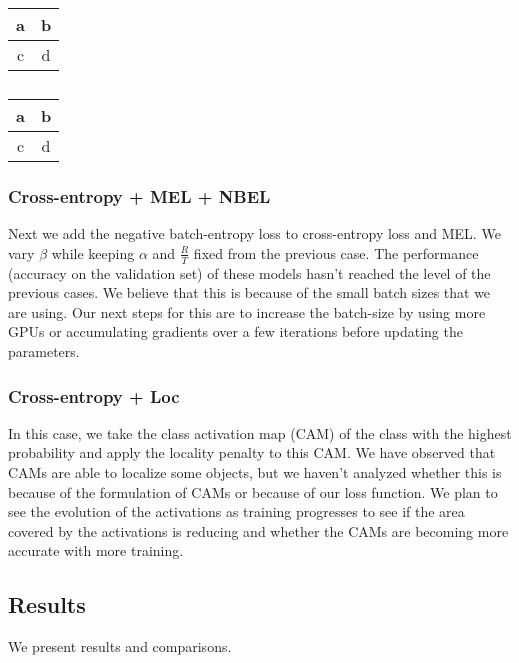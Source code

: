 \begin{table}
	\centering
	\begin{subtable}{0.15\textwidth}
	\centering
	\begin{tabular}{|c|c|}
		\hline
		a & b \\
		\hline
		c & d\\
		\hline
	\end{tabular}
	\caption{}
	\label{tab:cifar_mel_ratio}
	\end{subtable}
	\begin{subtable}{0.15\textwidth}
	\centering
	\begin{tabular}{|c|c|}
		\hline
		a & b \\
		\hline
		c & d\\
		\hline
	\end{tabular}
	\caption{}
	\label{tab:cifar_mel_unsup}
	\end{subtable}
\end{table}

\subsubsection{Cross-entropy + MEL + NBEL}
Next we add the negative batch-entropy loss to cross-entropy loss and MEL. We vary $\beta$ while
keeping $\alpha$ and $\frac{R}{T}$ fixed from the previous case. The performance (accuracy on the
validation set) of these models hasn't reached the level of the previous cases. We
believe that this is because of the small batch sizes that we are using. Our next steps for this are
to increase the batch-size by using more GPUs or accumulating gradients over a few iterations before
updating the parameters.

\subsubsection{Cross-entropy + Loc}
In this case, we take the class activation map (CAM) of the class with the highest probability and
apply the locality penalty to this CAM. We have observed that CAMs
are able to localize some objects, but we haven't analyzed whether this is because of the
formulation of CAMs or because of our loss function. We plan to see the evolution of the
activations as training progresses to see if the area covered by the activations is reducing and
whether the CAMs are becoming more accurate with more training. 

%

\subsection{Results}
We present results and comparisons.
